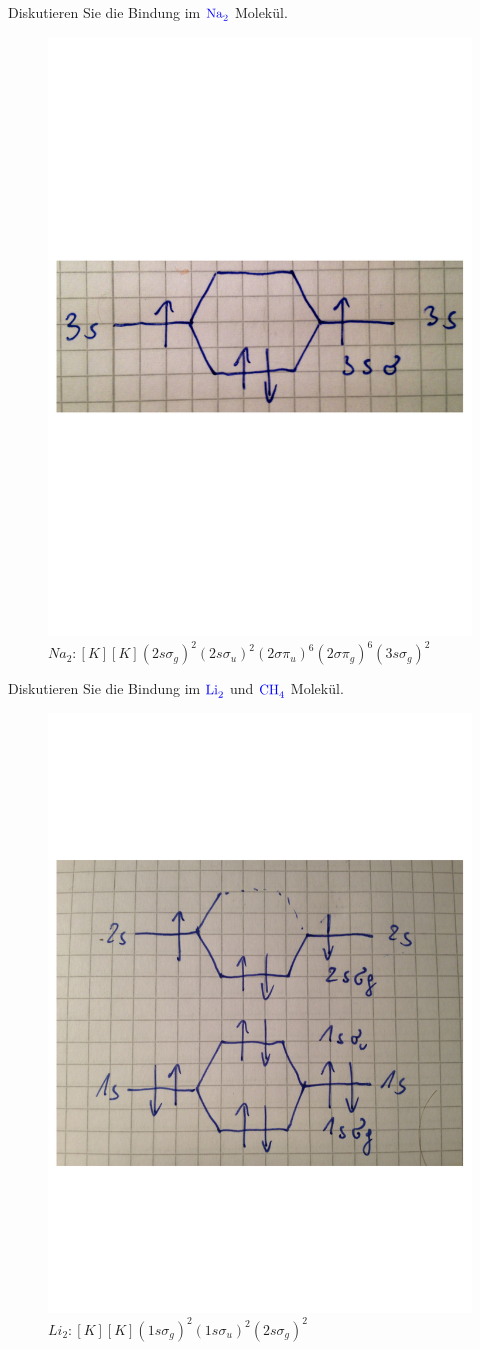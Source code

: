 \documentclass[a5paper,12pt,ngerman,print,grid=front]{kartei}
\let\oldce\ce
\renewcommand*{\ce}[1]{\begingroup\color{blue}\oldce{#1}\endgroup}
\begin{document}
	\begin{karte}{
		Diskutieren Sie die Bindung im $\ce{Na2}$ Molekül.
		}
		

		\begin{figure}
			\centering
			\includegraphics[width=0.5\linewidth]{./images/07_Na2}
			\caption[Na2]{$Na_2: [K][K]  (2s \sigma_g)^2 (2s \sigma_u)^2  (2 \sigma \pi_u)^6 (2 \sigma \pi_g)^6 (3s \sigma_g)^2  $}
			\label{fig:07_Na2}
		\end{figure}

		
	\end{karte}


	\begin{karte}{
		Diskutieren Sie die Bindung im $\ce{Li2}$ und $\ce{CH4}$ Molekül.
		}
		
		\begin{figure}
			\centering
			\includegraphics[width=0.3\linewidth]{./images/08_Li2}
			\caption[Li2]{$Li_2: [K][K]  (1s \sigma_g)^2 (1s \sigma_u)^2  (2s \sigma_g )^2   $}
			\label{fig:07_Na2}
		\end{figure}
		
	\end{karte}
\end{document}
